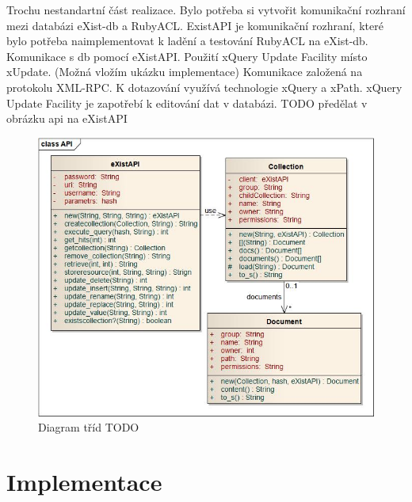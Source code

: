 {Trochu nestandartní část realizace. Bylo potřeba si vytvořit komunikační rozhraní mezi databázi eXist-db a RubyACL.
ExistAPI je komunikační rozhraní, které bylo potřeba naimplementovat k ladění a testování RubyACL na eXist-db.
Komunikace s db pomocí eXistAPI.
Použití xQuery Update Facility místo xUpdate. (Možná vložím ukázku implementace)
Komunikace založená na protokolu XML-RPC. K dotazování využívá technologie xQuery a xPath. xQuery Update Facility je zapotřebí k editování dat v databázi.
TODO předělat v obrázku api na eXistAPI
\begin{figure}
\includegraphics[width=15cm]{eXistAPI.jpg}
\caption{Diagram tříd TODO}
\label{fig:Diagram tříd TODO}
\end{figure}

\section{Implementace}



}
